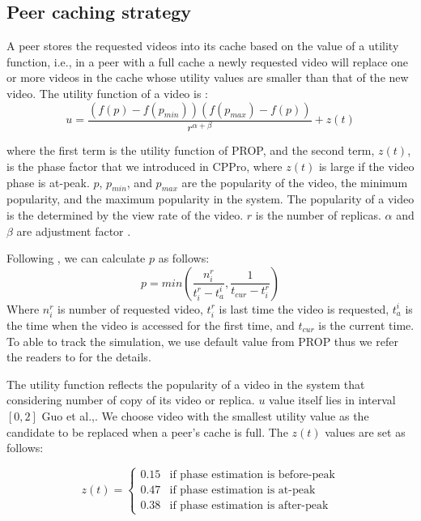 \subsection{Peer caching strategy}\label{peercachingstrategy}

A peer stores the requested videos into its cache based on the value of a utility function, i.e., in a peer with a full cache a newly requested video will replace one or more videos in the cache whose utility values are smaller than that of the new video.
The utility function of a video is :
\begin{equation}
u = \frac{ (f(p) - f(p_{min})) (f(p_{max}) - f(p)) }{r^{\alpha + \beta}} + z(t)
\end{equation}

where the first term is the utility function of PROP, and the second term, $z(t)$, is the phase factor that we introduced in CPPro, where $z(t)$ is large if the video phase is at-peak.
$p$, $p_{min}$, and $p_{max}$ are the popularity of the video, the minimum popularity, and the maximum popularity in the system.
The popularity of a video is the determined by the view rate of the video.
$r$ is the number of replicas. 
$\alpha$ and $\beta$ are adjustment factor \cite{1613869}.

Following \cite{1613869}, we can calculate $p$ as follows:
\begin{equation}
p = min \left(\frac{n_i^r}{t_i^r - t_a^i}  , \frac{1}{t_{cur} - t_i^r}\right)
\end{equation}
Where $n_i^r$ is number of requested video, $t_i^r$ is last time the video is requested, $t_a^i$ is the time when the video is accessed for the first time, and $t_{cur}$ is the current time.
To able to track the simulation, we use default value from PROP thus we refer the readers to \cite{1613869} for the details.

The utility function reflects the popularity of a video in the system that considering number of copy of its video or replica. 
$u$ value itself lies in interval $[0,2]$ Guo et al.,\cite{1613869}.
We choose video with the smallest utility value as the candidate to be replaced when a peer's cache is full.
The $z(t)$ values are set as follows:


\begin{equation}
 z(t) = 
  \begin{cases}
   0.15 & \text{if phase estimation is before-peak} \\
   0.47 & \text{if phase estimation is at-peak} \\
   0.38 & \text{if phase estimation is after-peak}
  \end{cases}
\end{equation}\label{eq:zfactor}


